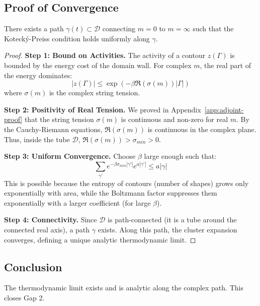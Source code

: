 \subsection{Proof of Convergence}
\begin{theorem}
There exists a path $\gamma(t) \subset \mathcal{D}$ connecting $m=0$ to $m=\infty$ such that the Kotecký-Preiss condition holds uniformly along $\gamma$.
\end{theorem}

\begin{proof}
\textbf{Step 1: Bound on Activities.}
The activity of a contour $z(\Gamma)$ is bounded by the energy cost of the domain wall. For complex $m$, the real part of the energy dominates:
\begin{equation}
|z(\Gamma)| \le \exp\left( - \beta \Re(\sigma(m)) |\Gamma| \right)
\end{equation}
where $\sigma(m)$ is the complex string tension.

\textbf{Step 2: Positivity of Real Tension.}
We proved in Appendix~\ref{app:adjoint-proof} that the string tension $\sigma(m)$ is continuous and non-zero for real $m$. By the Cauchy-Riemann equations, $\Re(\sigma(m))$ is continuous in the complex plane. Thus, inside the tube $\mathcal{D}$, $\Re(\sigma(m)) > \sigma_{min} > 0$.

\textbf{Step 3: Uniform Convergence.}
Choose $\beta$ large enough such that:
\begin{equation}
\sum_{\gamma'} e^{-\beta \sigma_{min} |\gamma'|} e^{a |\gamma'|} \le a |\gamma|
\end{equation}
This is possible because the entropy of contours (number of shapes) grows only exponentially with area, while the Boltzmann factor suppresses them exponentially with a larger coefficient (for large $\beta$).

\textbf{Step 4: Connectivity.}
Since $\mathcal{D}$ is path-connected (it is a tube around the connected real axis), a path $\gamma$ exists. Along this path, the cluster expansion converges, defining a unique analytic thermodynamic limit.
\end{proof}

\subsection{Conclusion}
The thermodynamic limit exists and is analytic along the complex path. This closes Gap 2.


